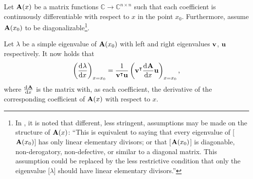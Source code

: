 \begin{theorem}[Lancaster 1964]\label{the:c3_eigenvalue_derivative}
    Let $\vb{A}(x)$ be a matrix functions $\mathbb{C} \to \mathbb{C}^{n\times n}$ such that each coefficient is continuously differentiable with respect to $x$ in the point $x_0$. Furthermore, assume $\vb{A}(x_0)$ to be diagonalizable\footnote{In \cite{lancaster_eigenvalues_1964}, it is noted that different, less stringent, assumptions may be made on the structure of $\vb{A}(x)$: ``This is equivalent to saying that every eigenvalue of [$\vb{A}(x_0)$] has only linear elementary divisors; or that [$\vb{A}(x_0)$] is diagonable, non-derogatory, non-defective, or similar to a diagonal matrix. This assumption could be replaced by the less restrictive condition that only the eigenvalue [$\lambda$] should have linear elementary divisors.''}.

    Let $\lambda$ be a simple eigenvalue of $\vb{A}(x_0)$ with left and right eigenvalues $\vb{v}$, $\vb{u}$ respectively. It now holds that
    $$
        \left(\dv[]{\lambda}{x}\right)_{x=x_0} = \frac{1}{{\vb{v}}^\intercal\vb{u}} \left({\vb{v}}^\intercal\dv[]{\vb{A}}{x} \vb{u} \right)_{x=x_0}\text{,}
    $$
    where $\dv[]{\vb{A}}{x}$ is the matrix with, as each coefficient, the derivative of the corresponding coefficient of $\vb{A}(x)$ with respect to $x$.

\end{theorem}
